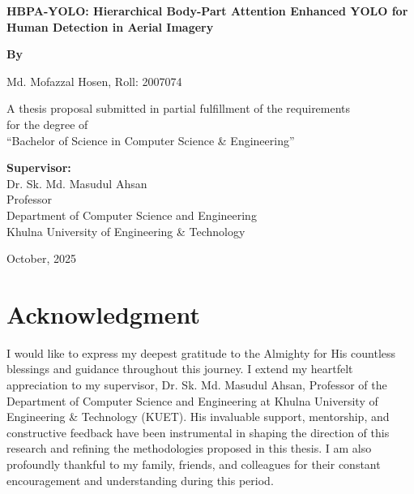 \documentclass[12pt, a4paper]{report}
\begin{document}
\begin{center}
    {\Large\bfseries HBPA-YOLO: Hierarchical Body-Part Attention Enhanced YOLO for Human Detection in Aerial Imagery}
    
    \vspace{0.5in}
    
    {\large\bfseries By}
    
    \vspace{0.3in}
    
    {\large Md. Mofazzal Hosen, Roll: 2007074\\}
    
    \vspace{0.5in}
    
    A thesis proposal submitted in partial fulfillment of the requirements\\
    for the degree of\\
    ``Bachelor of Science in Computer Science \& Engineering''
    
    \vspace{0.5in}
    
    \textbf{Supervisor:}\\
    Dr. Sk. Md. Masudul Ahsan\\
    Professor\\
    Department of Computer Science and Engineering\\
    Khulna University of Engineering \& Technology
    
    \vspace{0.3in}
    
    October, 2025
\end{center}

\newpage
\chapter*{Acknowledgment}

I would like to express my deepest gratitude to the Almighty for His countless blessings and guidance throughout this journey. I extend my heartfelt appreciation to my supervisor, Dr. Sk. Md. Masudul Ahsan, Professor of the Department of Computer Science and Engineering at Khulna University of Engineering \& Technology (KUET). His invaluable support, mentorship, and constructive feedback have been instrumental in shaping the direction of this research and refining the methodologies proposed in this thesis. I am also profoundly thankful to my family, friends, and colleagues for their constant encouragement and understanding during this period.
\end{document}
